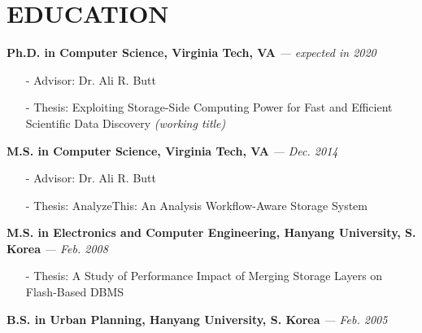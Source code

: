 \section{EDUCATION}
\vspace{0.03in} 
{\bf Ph.D. in Computer Science, Virginia Tech, VA}
{\footnotesize{\it --- expected in 2020}}
\begin{itemize}[leftmargin=*]
\setlength\itemsep{-0.02in}
  \item[-] {\small Advisor: Dr. Ali R. Butt}
  \item[-] {\small Thesis: Exploiting Storage-Side Computing Power 
                   for Fast and Efficient Scientific Data Discovery
            {\footnotesize{\it(working title)}}}
\end{itemize}
\vspace{-0.15in}
{\bf M.S. in Computer Science, Virginia Tech, VA}
{\footnotesize{\it --- Dec. 2014}}
\begin{itemize}[leftmargin=*]
\setlength\itemsep{-0.02in}
  \item[-] {\small Advisor: Dr. Ali R. Butt}
  \item[-] {\small Thesis: AnalyzeThis: An Analysis Workflow-Aware Storage System}
\end{itemize}
\vspace{-0.15in}
{\bf M.S. in Electronics and Computer Engineering, Hanyang University, S. Korea}
{\footnotesize{\it --- Feb. 2008}}
\begin{itemize}[leftmargin=*]
\setlength\itemsep{-0.02in}
  \item[-] {\small Thesis: A Study of Performance Impact of Merging Storage Layers on
  Flash-Based DBMS}
\end{itemize}
\vspace{-0.15in}
{\bf B.S. in Urban Planning, Hanyang University, S. Korea}
{\footnotesize{\it --- Feb. 2005}}


